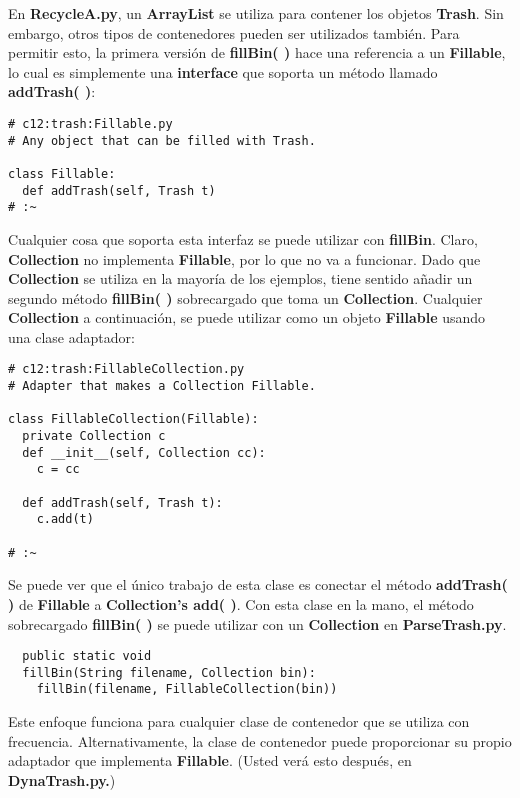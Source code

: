En \textbf{RecycleA.py}, un \textbf{ArrayList} se utiliza para contener los objetos \textbf{Trash}. Sin embargo, otros tipos de contenedores pueden ser utilizados también. Para permitir esto, la primera versión de \textbf{fillBin( )} hace una referencia a un \textbf{Fillable}, lo cual es simplemente una \textbf{interface} que soporta un método llamado \textbf{addTrash( )}:     \newline

\begin{lstlisting} 
# c12:trash:Fillable.py  
# Any object that can be filled with Trash.

class Fillable: 
  def addTrash(self, Trash t) 
# :~ 
\end{lstlisting}

Cualquier cosa que soporta esta interfaz se puede utilizar con \textbf{fillBin}. Claro, \textbf{Collection} no implementa \textbf{Fillable}, por lo que no va a funcionar. Dado que \textbf{Collection} se utiliza en la mayoría de los ejemplos, tiene sentido añadir un segundo método \textbf{fillBin( )} sobrecargado que toma un \textbf{Collection}. Cualquier \textbf{Collection} a continuación, se puede utilizar como un objeto \textbf{Fillable} usando una clase adaptador:   \newline

\begin{lstlisting} 
# c12:trash:FillableCollection.py  
# Adapter that makes a Collection Fillable. 

class FillableCollection(Fillable): 
  private Collection c 
  def __init__(self, Collection cc):  
    c = cc  
    
  def addTrash(self, Trash t): 
    c.add(t) 
    
# :~ 
\end{lstlisting}

Se puede ver que el único trabajo de esta clase es conectar el método \textbf{addTrash( )} de \textbf{Fillable} a \textbf{Collection’s add( )}. Con esta clase en la mano, el método sobrecargado \textbf{fillBin( )}  se puede utilizar con un \textbf{Collection} en \textbf{ParseTrash.py}.   \newline

\begin{lstlisting} 
  public static void  
  fillBin(String filename, Collection bin): 
    fillBin(filename, FillableCollection(bin)) 
\end{lstlisting}

Este enfoque funciona para cualquier clase de contenedor que se utiliza con frecuencia. Alternativamente, la clase de contenedor puede proporcionar su propio adaptador que implementa \textbf{Fillable}. (Usted verá esto después, en \textbf{DynaTrash.py.})     \newline



